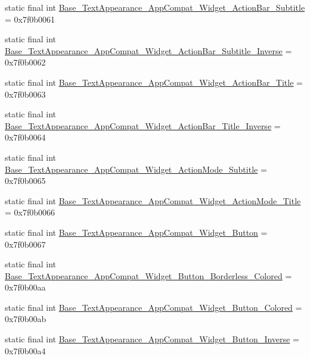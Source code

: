 \begin{CompactItemize}
\item 
static final int \hyperlink{classandroid_1_1support_1_1graphics_1_1drawable_1_1animated_1_1_r_1_1style_981db13805eb0cd2c53d3231f7ed74a0}{Base\_\-TextAppearance\_\-AppCompat\_\-Widget\_\-ActionBar\_\-Subtitle} = 0x7f0b0061
\item 
static final int \hyperlink{classandroid_1_1support_1_1graphics_1_1drawable_1_1animated_1_1_r_1_1style_4107139848caf68f034a9bb2b9b8c515}{Base\_\-TextAppearance\_\-AppCompat\_\-Widget\_\-ActionBar\_\-Subtitle\_\-Inverse} = 0x7f0b0062
\item 
static final int \hyperlink{classandroid_1_1support_1_1graphics_1_1drawable_1_1animated_1_1_r_1_1style_b9fe17f3054d09b1e301aca630a8403e}{Base\_\-TextAppearance\_\-AppCompat\_\-Widget\_\-ActionBar\_\-Title} = 0x7f0b0063
\item 
static final int \hyperlink{classandroid_1_1support_1_1graphics_1_1drawable_1_1animated_1_1_r_1_1style_275844189a5ea933b2e04309764d8bc8}{Base\_\-TextAppearance\_\-AppCompat\_\-Widget\_\-ActionBar\_\-Title\_\-Inverse} = 0x7f0b0064
\item 
static final int \hyperlink{classandroid_1_1support_1_1graphics_1_1drawable_1_1animated_1_1_r_1_1style_f28fcafa3503193401943240893aa3f5}{Base\_\-TextAppearance\_\-AppCompat\_\-Widget\_\-ActionMode\_\-Subtitle} = 0x7f0b0065
\item 
static final int \hyperlink{classandroid_1_1support_1_1graphics_1_1drawable_1_1animated_1_1_r_1_1style_92dc134a1af0f6ccfd114902b5fe7b7f}{Base\_\-TextAppearance\_\-AppCompat\_\-Widget\_\-ActionMode\_\-Title} = 0x7f0b0066
\item 
static final int \hyperlink{classandroid_1_1support_1_1graphics_1_1drawable_1_1animated_1_1_r_1_1style_f048897b426a91de99f088ff3aab1238}{Base\_\-TextAppearance\_\-AppCompat\_\-Widget\_\-Button} = 0x7f0b0067
\item 
static final int \hyperlink{classandroid_1_1support_1_1graphics_1_1drawable_1_1animated_1_1_r_1_1style_037bd7cee943fa99131b931a9dc76c49}{Base\_\-TextAppearance\_\-AppCompat\_\-Widget\_\-Button\_\-Borderless\_\-Colored} = 0x7f0b00aa
\item 
static final int \hyperlink{classandroid_1_1support_1_1graphics_1_1drawable_1_1animated_1_1_r_1_1style_e46fffefe99e57473e654093283b983a}{Base\_\-TextAppearance\_\-AppCompat\_\-Widget\_\-Button\_\-Colored} = 0x7f0b00ab
\item 
static final int \hyperlink{classandroid_1_1support_1_1graphics_1_1drawable_1_1animated_1_1_r_1_1style_c9995cd60ace30e59fa8deb57f86e732}{Base\_\-TextAppearance\_\-AppCompat\_\-Widget\_\-Button\_\-Inverse} = 0x7f0b00a4

\end{CompactItemize}
